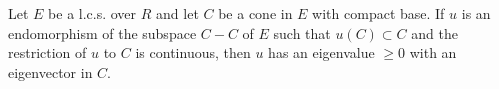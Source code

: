 Let $E$ be a l.c.s. over $R$ and let $C$ be a cone in $E$ with compact base. If $u$ is an endomorphism of the subspace $C - C$ of $E$ such that $u(C) \subset C$ and the restriction of $u$ to $C$ is continuous, then $u$ has an eigenvalue $\geq 0$ with an eigenvector in $C$.
